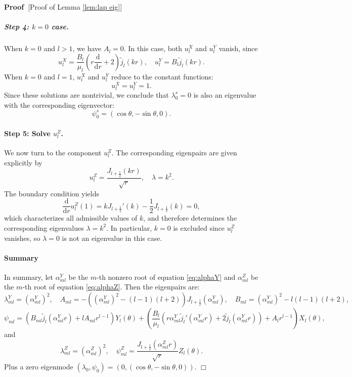\documentclass[11pt,a4paper]{article}
\numberwithin{equation}{section}
\newcommand{\mathd}{\mathrm{d}}
\newenvironment{proof}{\noindent\textbf{Proof\ }}{\hspace*{\fill}$\Box$\medskip}
\begin{document}
\begin{proof}[Proof of Lemma \ref{lem:lap eig}]
  \subparagraph{Step 4: $k = 0$ case.}
  
  When $k = 0$ and $l > 1$, we have $A_l = 0$. In this case, both $u^X_l$ and
  $u^Y_l$ vanish, since
  \[ u_l^X = \frac{B_l}{\mu_l}  \left( r \frac{\mathd}{\mathd r} + 2 \right) 
     \tilde{j}_l  (kr), \quad u_l^Y = B_l  \tilde{j}_l  (kr) . \]
  When $k = 0$ and $l = 1$, $u^X_l$ and $u^Y_l$ reduce to the constant
  functions:
  \[ u_l^X = u_l^Y = 1. \]
  Since these solutions are nontrivial, we conclude that $\lambda_0^s = 0$ is
  also an eigenvalue with the corresponding eigenvector:
  \[ \psi_0^s = (\cos \theta, - \sin \theta, 0) . \]
  
  \paragraph{Step 5: Solve $u_l^Z$.}
  
  We now turn to the component $u_l^Z$. The corresponding eigenpairs are given
  explicitly by
  \[ u_l^Z = \frac{J_{l + \frac{1}{2}}  (kr)}{\sqrt{r}}, \quad \lambda = k^2 .
  \]
  The boundary condition yields
  \begin{equation}
    \frac{\mathd}{\mathd r} u_l^Z (1) = kJ_{l + \frac{1}{2}}' (k) -
    \frac{1}{2} J_{l + \frac{1}{2}} (k) = 0,
  \end{equation}
  which characterizes all admissible values of $k$, and therefore determines
  the corresponding eigenvalues $\lambda = k^2$. In particular, $k = 0$ is
  excluded since $u_l^Z$ vanishes, so $\lambda = 0$ is not an eigenvalue in
  this case.
  
  \paragraph{Summary}
  
  In summary, let $\alpha^Y_{ml}$ be the $m$-th nonzero root of equation
  \eqref{eq:alphaY} and $\alpha^Z_{ml}$ be the $m$-th root of equation
  \eqref{eq:alphaZ}. Then the eigenpairs are:
  \[ \lambda_{ml}^Y = (\alpha^Y_{ml})^2, \quad A_{ml} = - ((\alpha^Y_{ml})^2 -
     (l - 1) (l + 2)) J_{l + \frac{1}{2}} (\alpha^Y_{ml}), \quad B_{ml} =
     (\alpha^Y_{ml})^2 - l (l - 1)  (l + 2), \]
  \[ \psi_{ml} = (B_{ml}  \tilde{j}_l (\alpha^Y_{ml} r) + lA_{ml} r^{l - 1})
     Y_l (\theta) + \left( \frac{B_l}{\mu_l} (r \alpha^Y_{ml}  \tilde{j}_l'
     (\alpha^Y_{ml} r) + 2 \tilde{j}_l (\alpha^Y_{ml} r)) + A_l r^{l - 1}
     \right) X_l (\theta), \]
  and
  \[ \lambda_{ml}^Z = (\alpha^Z_{ml})^2, \quad \psi_{ml}^Z = \frac{J_{l +
     \frac{1}{2}}  (\alpha^Z_{ml} r)}{\sqrt{r}} Z_l (\theta) . \]
  Plus a zero eigenmode $(\lambda_0, \psi_0) = (0, (\cos \theta, - \sin
  \theta, 0))$.
\end{proof}
\end{document}

